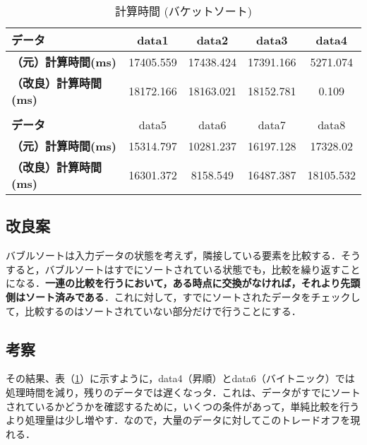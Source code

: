\documentclass[a4j, titlepage]{jarticle}
\begin{document}
            \begin{table}[tbh]
                \caption{計算時間 (バケットソート)}
                \label{tab:bubble}
                \begin{center}
                    \begin{tabular}{lcccc}
                        \hline
                        \textbf{データ} & data1 & data2 &data3 &data4 \\ \hline
                        \textbf{（元）計算時間(ms)} & 17405.559 & 17438.424 & 17391.166 & \cellcolor{green!20}5271.074\\ \hline
                        \textbf{（改良）計算時間(ms)} & 18172.166 & 18163.021 & 18152.781 & \cellcolor{green!20}0.109\\ \hline
                        \\ \hline
                        \textbf{データ} & data5 &data6 &data7 &data8\\ \hline
                        \textbf{（元）計算時間(ms)} & 15314.797 & \cellcolor{green!20}10281.237 & 16197.128 & 17328.02\\ \hline
                        \textbf{（改良）計算時間(ms)} & 16301.372 & \cellcolor{green!20}8158.549 & 16487.387 & 18105.532\\ \hline
                    \end{tabular}
                \end{center}
            \end{table}
        
        \subsection{改良案}
            バブルソートは入力データの状態を考えず，隣接している要素を比較する．そうすると，バブルソートはすでにソートされている状態でも，比較を繰り返すことになる．\textbf{一連の比較を行うにおいて，ある時点に交換がなければ，それより先頭側はソート済みである}\cite{cite:boyoh}．これに対して，すでにソートされたデータをチェックして，比較するのはソートされていない部分だけで行うことにする．
        
        \subsection{考察}
            その結果、表（\ref{tab:bubble}）に示すように，data4（昇順）とdata6（バイトニック）では処理時間を減り，残りのデータでは遅くなっタ．これは、データがすでにソートされているかどうかを確認するために，いくつの条件があって，単純比較を行うより処理量は少し増やす．なので，大量のデータに対してこのトレードオフを現れる．
\end{document}
